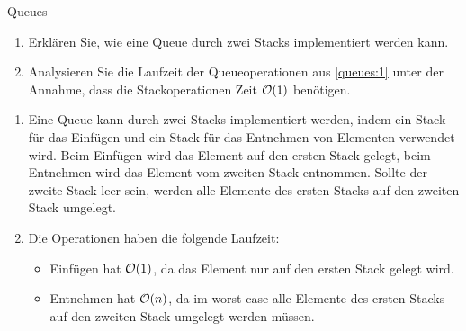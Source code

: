 \documentclass{article}
\begin{document}
\begin{exercise}{Queues}
  \begin{enumerate}
    \item\label{queues:1} Erklären Sie, wie eine Queue durch zwei Stacks implementiert werden kann.
    \item Analysieren Sie die Laufzeit der Queueoperationen aus \ref{queues:1} unter der Annahme, dass die Stackoperationen Zeit $\mathcal{O}(1)$ benötigen.
  \end{enumerate}

  \begin{solution}
    \begin{enumerate}
      \item Eine Queue kann durch zwei Stacks implementiert werden, indem ein Stack für das Einfügen und ein Stack für das Entnehmen von Elementen verwendet wird. Beim Einfügen wird das Element auf den ersten Stack gelegt, beim Entnehmen wird das Element vom zweiten Stack entnommen. Sollte der zweite Stack leer sein, werden alle Elemente des ersten Stacks auf den zweiten Stack umgelegt.
      \item Die Operationen haben die folgende Laufzeit:
            \begin{itemize}
              \item Einfügen hat $\mathcal{O}(1)$, da das Element nur auf den ersten Stack gelegt wird.
              \item Entnehmen hat $\mathcal{O}(n)$, da im worst-case alle Elemente des ersten Stacks auf den zweiten Stack umgelegt werden müssen.
            \end{itemize}
    \end{enumerate}
  \end{solution}
\end{exercise}
\end{document}
